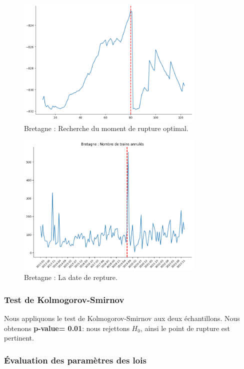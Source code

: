 {\begin{figure}[H]
\centering
\includegraphics[width=0.8\textwidth]{image/BR-FIG10.png} 
\caption{Bretagne : Recherche du moment de rupture optimal.}
\label{fig:trains_ANNULES_2}
\end{figure}


\begin{figure}[H]
\centering
\includegraphics[width=0.8\textwidth]{image/BR-FIG09.png} 
\caption{Bretagne : La date de repture.}
\label{fig:trains_ANNULES_2}
\end{figure}




\subsubsection{Test de Kolmogorov-Smirnov}

Nous appliquons le test de Kolmogorov-Smirnov aux deux échantillons. Nous obtenons \textbf{p-value=  0.01}: nous rejettons $H_0$, ainsi le point de rupture est pertinent.

\subsubsection{Évaluation des paramètres des lois}

}
